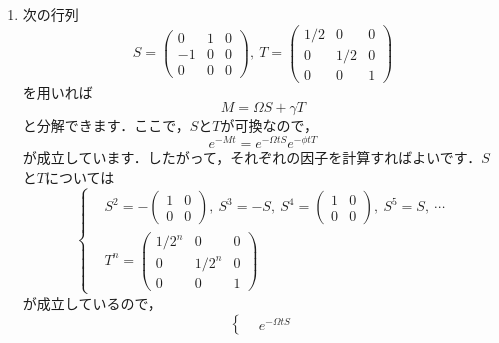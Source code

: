 \documentclass[a4paper,pdflatex,ja=standard]{bxjsarticle}
\begin{document}
\begin{enumerate}
  \item 
  次の行列
  \begin{equation}
    S
    =
    \begin{pmatrix}
      0 & 1 & 0 \\
      -1 & 0 & 0 \\
      0 & 0 & 0
    \end{pmatrix}
    ,\ 
    T
    =
    \begin{pmatrix}
      1/2 & 0 & 0 \\
      0 & 1/2 & 0 \\
      0 & 0 & 1
    \end{pmatrix}
  \end{equation}
  を用いれば
  \begin{equation}
    M
    =
    \Omega S
    +
    \gamma T
  \end{equation}
  と分解できます．ここで，$S$と$T$が可換なので，
  \begin{equation}
    e^{-Mt}
    =
    e^{-\Omega t S}e^{-\phi t T}
  \end{equation}
  が成立しています．したがって，それぞれの因子を計算すればよいです．$S$と$T$については
  \begin{equation}
    \left\{
      \begin{alignedat}{1}
        &
        S^2
        =
        -
        \begin{pmatrix}
          1 & 0 \\
          0 & 0  
        \end{pmatrix}
        ,\ 
        S^3
        =
        -S
        ,\ 
        S^4
        =
        \begin{pmatrix}
          1 & 0 \\
          0 & 0  
        \end{pmatrix}
        ,\ 
        S^5
        =
        S
        ,\ \cdots
        \\
        &
        T^n
        =
        \begin{pmatrix}
          1/2^n & 0 & 0 \\
          0 & 1/2^n & 0 \\
          0 & 0 & 1
        \end{pmatrix}
      \end{alignedat}
    \right.
  \end{equation}
  が成立しているので，
  \begin{equation}
    \left\{
      \begin{alignedat}{1}
        &
        e^{-\Omega t S}

\end{alignedat}
\end{equation}
\end{enumerate}
\end{document}
